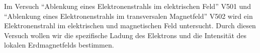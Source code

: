 Im Versuch \enquote{Ablenkung eines Elektronenstrahls im elektrischen Feld} V501 
und \enquote{Ablenkung eines Elektronenstrahls im transversalen Magnetfeld} V502 
wird ein Elektronenstrahl im elektrischen und magnetischen Feld 
untersucht. Durch diesen Versuch wollen wir die spezifische Ladung des 
Elektrons und die Intensität des lokalen 
Erdmagnetfelds bestimmen.
